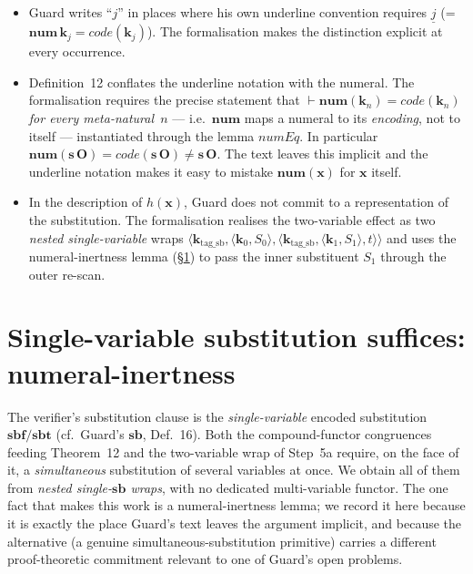 \documentclass[11pt]{article}
\theoremstyle{plain}
\theoremstyle{definition}
\theoremstyle{remark}
\newcommand{\code}[1]{\mathit{code}(#1)}
\newcommand{\sbf}{\mathbf{sbf}}
\newcommand{\sbt}{\mathbf{sbt}}
\newcommand{\num}{\mathbf{num}}
\newcommand{\seq}[1]{\langle #1 \rangle}
\begin{document}
\begin{itemize}
\item Guard writes ``$j$'' in places where his own underline convention
requires $\underline{j}$ (= $\num\,\mathbf{k}_j = \code{\mathbf{k}_j}$).
The formalisation makes the distinction explicit at every occurrence.

\item Definition~12 conflates the underline notation with the
numeral.  The formalisation requires the precise statement that
$\vdash \num(\mathbf{k}_n) = \code{\mathbf{k}_n}$ \emph{for every
meta-natural~$n$} --- i.e.\ $\num$ maps a numeral to its
\emph{encoding}, not to itself --- instantiated through the lemma
$\mathit{numEq}$.  In particular $\num(\mathbf{s}\,\mathbf{O}) =
\code{\mathbf{s}\,\mathbf{O}} \neq \mathbf{s}\,\mathbf{O}$.  The text
leaves this implicit and the underline notation makes it easy to
mistake $\num(\mathbf{x})$ for $\mathbf{x}$ itself.

\item In the description of $h(\mathbf{x})$, Guard does not commit to a
representation of the substitution.  The formalisation realises the
two-variable effect as two \emph{nested single-variable} wraps
$\seq{\mathbf{k}_{\mathrm{tag\_sb}}, \seq{\mathbf{k}_0, S_0},
\seq{\mathbf{k}_{\mathrm{tag\_sb}}, \seq{\mathbf{k}_1, S_1}, t}}$ and uses
the numeral-inertness lemma ({\S}\ref{sec:sb2}) to pass the inner
substituent $S_1$ through the outer re-scan.
\end{itemize}

\section{Single-variable substitution suffices: numeral-inertness}
\label{sec:sb2}

The verifier's substitution clause is the \emph{single-variable} encoded
substitution $\sbf/\sbt$ (cf.\ Guard's $\mathbf{sb}$, Def.~16).  Both the
compound-functor congruences feeding Theorem~12 and the two-variable wrap of
Step~5a require, on the face of it, a \emph{simultaneous} substitution of
several variables at once.  We obtain all of them from \emph{nested
single-$\mathbf{sb}$ wraps}, with no dedicated multi-variable functor.  The
one fact that makes this work is a numeral-inertness lemma; we record it
here because it is exactly the place Guard's text leaves the argument
implicit, and because the alternative (a genuine simultaneous-substitution
primitive) carries a different proof-theoretic commitment relevant to one of
Guard's open problems.
\end{document}
